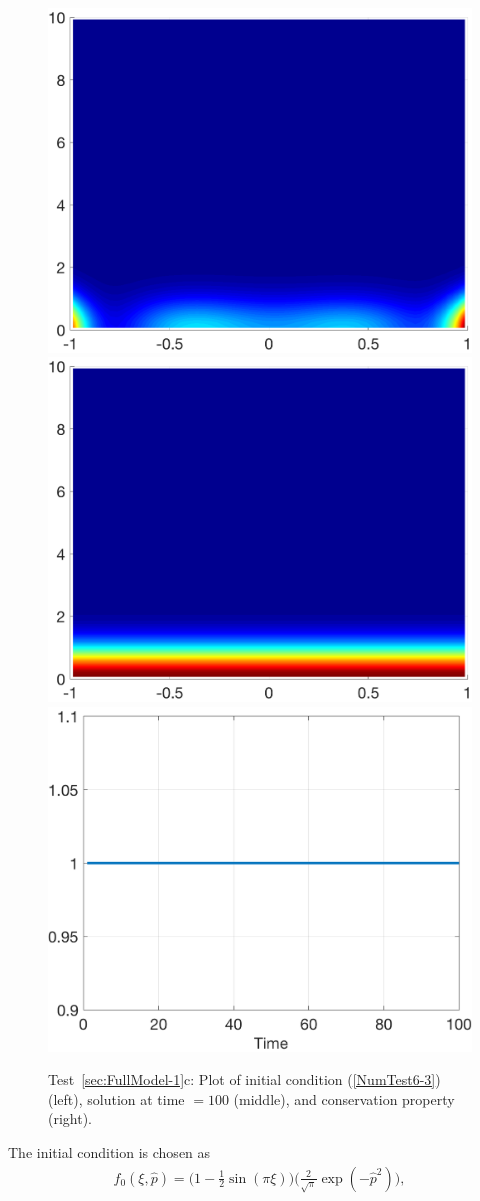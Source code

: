 \documentclass[preprint,11pt]{elsarticle}
\begin{document}
\begin{figure}[H]
\centering
\includegraphics[width=.32\textwidth]{./NumFig/FullModel2D-3-1}
\includegraphics[width=.32\textwidth]{./NumFig/FullModel2D-3-100}
\includegraphics[width=.32\textwidth]{./NumFig/FullModel2D-3-conv}
\caption{Test~\ref{sec:FullModel-1}c: Plot of initial condition (\ref{NumTest6-3}) (left), solution at time $= 100$ (middle), and conservation property (right).}
\end{figure}

The initial condition is chosen as 
\begin{eqnarray}
 f_0(\xi,\hat{p})=\bigg(1-\frac{1}{2}\sin(\pi \xi)\bigg) \bigg(\frac{2}{\sqrt{\pi}}\exp(-\hat{p}^2)\bigg), \label{NumTest6-4}
\end{eqnarray}
\end{document}
